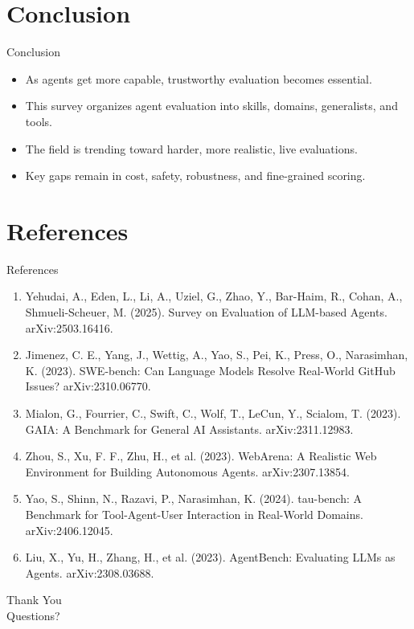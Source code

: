 \documentclass[10pt]{beamer}
\begin{document}
\section{Conclusion}
\begin{frame}{Conclusion}
\begin{itemize}
  \item As agents get more capable, trustworthy evaluation becomes essential.
  \item This survey organizes agent evaluation into skills, domains, generalists, and tools.
  \item The field is trending toward harder, more realistic, live evaluations.
  \item Key gaps remain in cost, safety, robustness, and fine-grained scoring.
\end{itemize}
\end{frame}
\section{References}
\begin{frame}[allowframebreaks]{References}
  \footnotesize
  \begin{enumerate}
    \item Yehudai, A., Eden, L., Li, A., Uziel, G., Zhao, Y., Bar-Haim, R., Cohan, A., Shmueli-Scheuer, M. (2025). Survey on Evaluation of LLM-based Agents. arXiv:2503.16416.
    \item Jimenez, C. E., Yang, J., Wettig, A., Yao, S., Pei, K., Press, O., Narasimhan, K. (2023). SWE-bench: Can Language Models Resolve Real-World GitHub Issues? arXiv:2310.06770.
    \item Mialon, G., Fourrier, C., Swift, C., Wolf, T., LeCun, Y., Scialom, T. (2023). GAIA: A Benchmark for General AI Assistants. arXiv:2311.12983.
    \item Zhou, S., Xu, F. F., Zhu, H., et al. (2023). WebArena: A Realistic Web Environment for Building Autonomous Agents. arXiv:2307.13854.
    \item Yao, S., Shinn, N., Razavi, P., Narasimhan, K. (2024). tau-bench: A Benchmark for Tool-Agent-User Interaction in Real-World Domains. arXiv:2406.12045.
    \item Liu, X., Yu, H., Zhang, H., et al. (2023). AgentBench: Evaluating LLMs as Agents. arXiv:2308.03688.
  \end{enumerate}
\end{frame}
\begin{frame}[plain]
  \begin{center}
    {\Huge Thank You}\\[1em]
    {\large Questions?}
  \end{center}
\end{frame}
\end{document}
